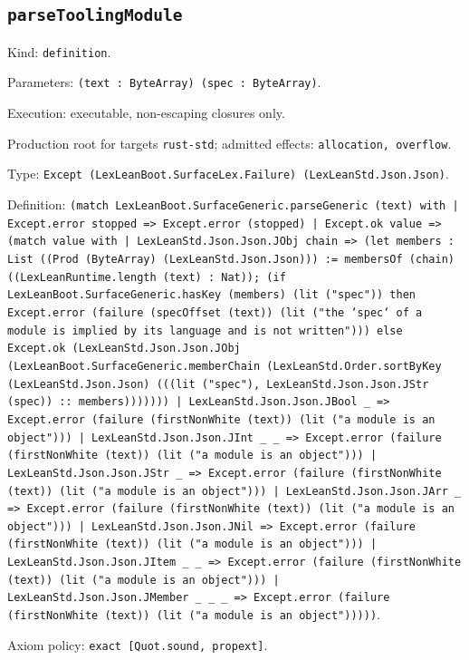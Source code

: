 \documentclass[11pt]{article}
\begin{document}
\subsection*{\texttt{parseToolingModule}}
\noindent Kind: \texttt{definition}.\par
\noindent Parameters: \texttt{(text : ByteArray) (spec : ByteArray)}.\par
\noindent Execution: executable, non-escaping closures only.\par
\noindent Production root for targets \texttt{rust-std}; admitted effects: \texttt{allocation, overflow}.\par
\noindent Type: \texttt{Except (LexLeanBoot.SurfaceLex.Failure) (LexLeanStd.Json.Json)}.\par
\noindent Definition: \texttt{(match LexLeanBoot.SurfaceGeneric.parseGeneric (text) with | Except.error stopped => Except.error (stopped) | Except.ok value => (match value with | LexLeanStd.Json.Json.JObj chain => (let members : List ((Prod (ByteArray) (LexLeanStd.Json.Json))) := membersOf (chain) ((LexLeanRuntime.length (text) : Nat)); (if LexLeanBoot.SurfaceGeneric.hasKey (members) (lit ("spec")) then Except.error (failure (specOffset (text)) (lit ("the `spec` of a module is implied by its language and is not written"))) else Except.ok (LexLeanStd.Json.Json.JObj (LexLeanBoot.SurfaceGeneric.memberChain (LexLeanStd.Order.sortByKey (LexLeanStd.Json.Json) (((lit ("spec"), LexLeanStd.Json.Json.JStr (spec)) :: members))))))) | LexLeanStd.Json.Json.JBool \_ => Except.error (failure (firstNonWhite (text)) (lit ("a module is an object"))) | LexLeanStd.Json.Json.JInt \_ \_ => Except.error (failure (firstNonWhite (text)) (lit ("a module is an object"))) | LexLeanStd.Json.Json.JStr \_ => Except.error (failure (firstNonWhite (text)) (lit ("a module is an object"))) | LexLeanStd.Json.Json.JArr \_ => Except.error (failure (firstNonWhite (text)) (lit ("a module is an object"))) | LexLeanStd.Json.Json.JNil => Except.error (failure (firstNonWhite (text)) (lit ("a module is an object"))) | LexLeanStd.Json.Json.JItem \_ \_ => Except.error (failure (firstNonWhite (text)) (lit ("a module is an object"))) | LexLeanStd.Json.Json.JMember \_ \_ \_ => Except.error (failure (firstNonWhite (text)) (lit ("a module is an object")))))}.\par
\noindent Axiom policy: \texttt{exact [Quot.sound, propext]}.\par
\end{document}
